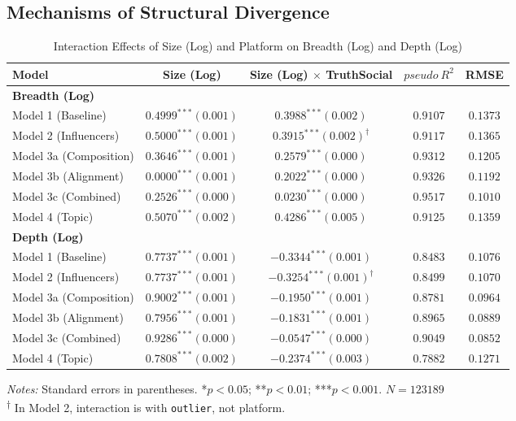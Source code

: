 \documentclass[letterpaper]{article} %
\begin{document}
\subsection{Mechanisms of Structural Divergence}

\begin{table}[]
\centering
\caption{Interaction Effects of Size (Log) and Platform on Breadth (Log) and Depth (Log)}
\label{model}
\begin{tabular}{lcccc}
\hline
\textbf{Model} & Size (Log) & Size (Log) $\times$ TruthSocial & $pseudo\ R^2$ & RMSE  \\
\hline
\hline
\multicolumn{5}{l}{\textbf{Breadth (Log)}} \\
\hline
Model 1 (Baseline) & $0.4999^{***} (0.001)$ & $0.3988^{***} (0.002)$ & $0.9107$ & $0.1373$  \\
Model 2 (Influencers) & $0.5000^{***} (0.001)$ & $0.3915^{***} (0.002)^{\dagger}$ & $0.9117$ & $0.1365$  \\
Model 3a (Composition) &$0.3646^{***} (0.001)$  & $0.2579^{***} (0.000)$ & $0.9312$ &$0.1205$ \\
Model 3b (Alignment) &  $0.0000^{***} (0.001)$  & $0.2022^{***} (0.000)$ & $0.9326$ &$0.1192$ \\
Model 3c (Combined) & $0.2526^{***} (0.000)$ & $0.0230^{***} (0.000)$ & $0.9517$ & $0.1010$  \\
Model 4 (Topic) & $0.5070^{***} (0.002)$ & $0.4286^{***} (0.005)$ & $0.9125$ & $0.1359$  \\
\hline
\hline
\multicolumn{5}{l}{\textbf{Depth (Log)}} \\
\hline
Model 1 (Baseline) & $0.7737^{***} (0.001)$ & $-0.3344^{***} (0.001)$ & $0.8483$ & $0.1076$  \\
Model 2 (Influencers) & $0.7737^{***} (0.001)$ & $-0.3254^{***} (0.001)^{\dagger}$ & $0.8499$ & $0.1070$  \\
Model 3a (Composition) & $0.9002^{***} (0.001)$ &$-0.1950^{***} (0.001)$ & $0.8781$ & $0.0964$  \\
Model 3b (Alignment) & $0.7956^{***} (0.001)$ &$-0.1831^{***} (0.001)$ & $0.8965$ & $0.0889$ \\
Model 3c (Combined) & $0.9286^{***} (0.000)$ & $-0.0547^{***} (0.000)$ & $0.9049$ & $ 0.0852$  \\
Model 4 (Topic) & $0.7808^{***} (0.002)$ & $-0.2374^{***} (0.003)$ & $0.7882$ & $0.1271$  \\
\hline
\hline
\end{tabular}

\begin{minipage}{0.95\linewidth}
\footnotesize
\textit{Notes:} Standard errors in parentheses. *$p<0.05$; **$p<0.01$; ***$p<0.001$. $N=123189$ \\
\textsuperscript{†} In Model 2, interaction is with \texttt{outlier}, not platform.
\end{minipage}
\end{table}
\end{document}
